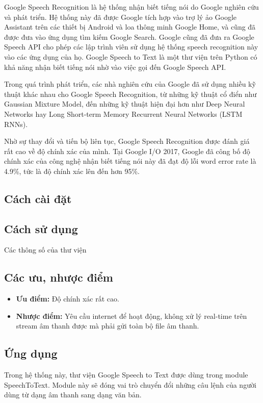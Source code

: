 Google Speech Recognition là hệ thống nhận biết tiếng nói do Google nghiên cứu và phát triển. Hệ thống này đã được Google tích hợp vào trợ lý ảo Google Assistant trên các thiết bị Android và loa thông minh Google Home, và cũng đã được đưa vào ứng dụng tìm kiếm Google Search. Google cũng đã đưa ra Google Speech API cho phép các lập trình viên sử dụng hệ thống speech recognition này vào các ứng dụng của họ. Google Speech to Text là một thư viện trên Python có khả năng nhận biết tiếng nói nhờ vào việc gọi đến Google Speech API.

Trong quá trình phát triển, các nhà nghiên cứu của Google đã sử dụng nhiều kỹ thuật khác nhau cho Google Speech Recognition, từ những kỹ thuật cổ điển như Gaussian Mixture Model, đến những kỹ thuật hiện đại hơn như Deep Neural Networks hay Long Short-term Memory Recurrent Neural Networks (LSTM RNNs)\cite{beaufays}.

Nhờ sự thay đổi và tiến bộ liên tục, Google Speech Recognition được đánh giá rất cao về độ chính xác của mình. Tại Google I/O 2017, Google đã công bố độ chính xác của công nghệ nhận biết tiếng nói này đã đạt độ lỗi word error rate là 4.9\%\cite{protalinski}, tức là độ chính xác lên đến hơn 95\%.

\subsection{Cách cài đặt}

\subsection{Cách sử dụng}

Các thông số của thư viện

\subsection{Các ưu, nhược điểm}

\begin{itemize}
    \item \textbf{Ưu điểm:} Độ chính xác rất cao.
    \item \textbf{Nhược điểm:} Yêu cầu internet để hoạt động, không xử lý real-time trên stream âm thanh được mà phải gửi toàn bộ file âm thanh.
\end{itemize}

\subsection{Ứng dụng}

Trong hệ thống này, thư viện Google Speech to Text được dùng trong module SpeechToText. Module này sẽ đóng vai trò chuyển đổi những câu lệnh của người dùng từ dạng âm thanh sang dạng văn bản.
